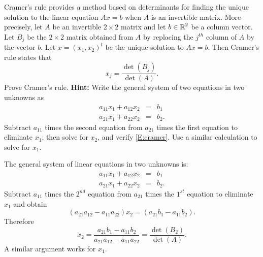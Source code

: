 \documentclass{ximera}
\begin{document}
\begin{exercise} \label{c7.8.4A}
Cramer's rule  provides a method based on determinants 
for finding the unique solution to the linear equation $Ax=b$ when $A$ is 
an invertible matrix.  More precisely, let $A$ be an invertible $2\times 2$ 
matrix and let $b\in\mbox{$\Bbb{R}$}^2$ be a column vector. Let $B_j$ be the $2\times 2$ 
matrix obtained from $A$ by replacing the $j^{th}$ column of $A$ by the vector 
$b$.  Let $x=(x_1,x_2)^t$ be the unique solution to $Ax=b$. Then Cramer's rule
states that 
\begin{equation}  \label{E:cramer}
x_j = \frac{\det(B_j)}{\det(A)}.
\end{equation}
Prove Cramer's rule.  {\bf Hint:}  Write the general system of two equations in 
two unknowns as
\begin{eqnarray*}
a_{11}x_1+a_{12}x_2 & = & b_1\\
a_{21}x_1+a_{22}x_2 & = & b_2.
\end{eqnarray*}
Subtract $a_{11}$ times the second equation from $a_{21}$ times the first 
equation to eliminate $x_1$; then solve for $x_2$, and verify \eqref{E:cramer}.  
Use a similar calculation to solve for $x_1$. 

\begin{solution}

The general system of linear equations in two unknowns is:
\begin{eqnarray*}
a_{11}x_1+a_{12}x_2 & = & b_1\\
a_{21}x_1+a_{22}x_2 & = & b_2.
\end{eqnarray*}
Subtract $a_{11}$ times the $2^{nd}$ equation from $a_{21}$ times the $1^{st}$ 
equation to eliminate $x_1$ and obtain
\[
(a_{21}a_{12}-a_{11}a_{22})x_2 = (a_{21}b_1-a_{11}b_2).
\]
Therefore
\[
x_2 =  \frac{a_{21}b_1-a_{11}b_2}{a_{21}a_{12}-a_{11}a_{22}}
= \frac{\det(B_2)}{\det(A)}.
\]
A similar argument works for $x_1$.

\end{solution}
\end{exercise}
\end{document}

